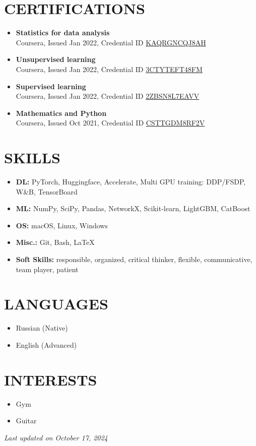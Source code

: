 \documentclass[11pt,a4paper]{moderncv}
\begin{document}
\section{CERTIFICATIONS}
\begin{itemize}
    \item \textbf{Statistics for data analysis}\\ Coursera, Issued Jan 2022, Credential ID \href{https://www.coursera.org/account/accomplishments/certificate/KAQRGNCQJ8AH}{KAQRGNCQJ8AH}
    \item \textbf{Unsupervised learning}\\ Coursera, Issued Jan 2022, Credential ID \href{https://www.coursera.org/account/accomplishments/certificate/3CTYTEFT48FM}{3CTYTEFT48FM}
    \item \textbf{Supervised learning}\\ Coursera, Issued Jan 2022, Credential ID \href{https://www.coursera.org/account/accomplishments/certificate/2ZBSN8L7EAVV}{2ZBSN8L7EAVV}
    \item \textbf{Mathematics and Python}\\ Coursera, Issued Oct 2021, Credential ID \href{https://www.coursera.org/account/accomplishments/certificate/CSTTGDM8RF2V}{CSTTGDM8RF2V}
\end{itemize}

\section{SKILLS}
\begin{itemize}
    \item \textbf{DL:} PyTorch, Huggingface, Accelerate, Multi GPU training: DDP/FSDP, W\&B, TensorBoard
    \item \textbf{ML:} NumPy, SciPy, Pandas, NetworkX, Scikit-learn, LightGBM, CatBoost
    \item \textbf{OS:} macOS, Linux, Windows
    \item \textbf{Misc.:} Git, Bash, \LaTeX
    \item \textbf{Soft Skills:} responsible, organized, critical thinker, flexible, communicative, team player, patient
\end{itemize}

\section{LANGUAGES}
\begin{itemize}
    \item Russian (Native)
    \item English (Advanced)
\end{itemize}

\section{INTERESTS}
\begin{itemize}
    \item Gym
    \item Guitar
\end{itemize}

\vspace{\fill}
\begin{center}
\textit{Last updated on October 17, 2024}
\end{center}
\vspace{-3.0cm}
\end{document}
